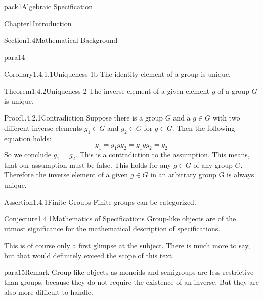 \documentclass[landscape, slides, light]{mmiss2}
\begin{document}
\begin{Package}{pack1}{Algebraic
Specification}
\begin{Section}{Chapter1}{Introduction}
\begin{Section}{Section1.4}{Mathematical Background}{}
\begin{Paragraph}{para14}{}{}
\begin{Corollary}[Algebra]{Corollary1.4.1.1}{Uniqueness 1b}{}
The identity element of a group is unique.
\end{Corollary}
\begin{Theorem}[Algebra]{Theorem1.4.2}{Uniqueness 2}{}
The inverse element of a given element $g$ of a group $G$ is unique.
\end{Theorem}

\begin{Proof}[Algebra]{Proof1.4.2.1}{Contradiction}{}
Suppose there is a group $G$ and a $g \in G$  with two different
inverse elements $g_{1} \in G$ and $g_{2} \in G$ for $g \in G$. Then
the following equation holds:
\begin{displaymath}
g_{1}=g_{1}gg_{2}=g_{1}gg_{2}=g_{2}
\end{displaymath}
So we conclude $g_{1}=g_{2}$. This is a contradiction to the
assumption. This means, that our assumption must be false. This holds
for any $g \in G$ of any group $G$. Therefore the inverse element of a
given $g \in G$ in an arbitrary group G is always unique.
\end{Proof}
\begin{Assertion}[Algebra]{Assertion1.4.1}{Finite Groups}{}
Finite groups can be categorized. 
\end{Assertion}

\begin{Conjecture}[Specifications]{Conjecture1.4.1}{Mathematics of
Specifications}{}
Group-like objects are of the utmost significance for the mathematical
description of specifications.
\end{Conjecture}
\hfill  %
This is of course only a first glimpse at the subject. There is much
more to say, but that would definitely exceed the scope of this text.
\end{Paragraph}
\begin{Paragraph}{para15}{Remark}{}
Group-like objects as monoids and semigroups are less restrictive than
groups, because they do not require the existence of an
inverse. But they are also more difficult
 to handle.
\end{Paragraph}
\end{Section}

\end{Section}

\end{Package}
\end{document}
